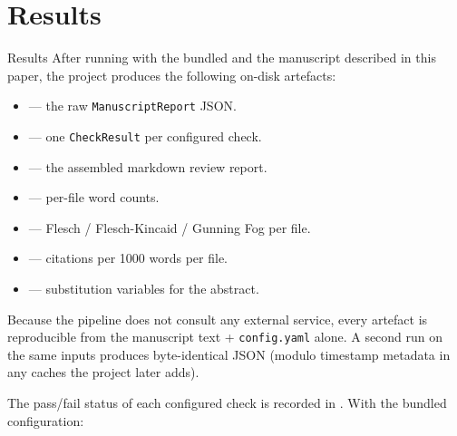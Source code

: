 \documentclass[
  ignorenonframetext,
]{beamer}
\author{\texorpdfstring{}{}}
\date{}
\providecommand{\tightlist}{%
  \setlength{\itemsep}{0pt}\setlength{\parskip}{0pt}}
\begin{document}
\section{Results}\label{sec:results}

\begin{frame}{Results}
After running  with the bundled
 and the manuscript described in this
paper, the project produces the following on-disk artefacts:

\begin{itemize}
\tightlist
\item
   --- the raw
  \texttt{ManuscriptReport} JSON.
\item
   --- one \texttt{CheckResult} per
  configured check.
\item
   --- the assembled markdown review
  report.
\item
   --- per-file word
  counts.
\item
   --- Flesch /
  Flesch-Kincaid / Gunning Fog per file.
\item
   --- citations per 1000
  words per file.
\item
   --- substitution
  variables for the abstract.
\end{itemize}

Because the pipeline does not consult any external service, every
artefact is reproducible from the manuscript text + \texttt{config.yaml}
alone. A second run on the same inputs produces byte-identical JSON
(modulo timestamp metadata in any caches the project later adds).

The pass/fail status of each configured check is recorded in
. With the bundled configuration:


\end{frame}
\end{document}

